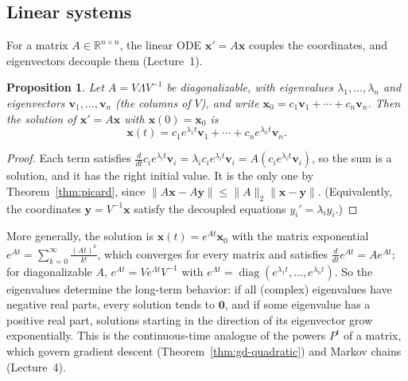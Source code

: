 \documentclass[11pt]{article}
\newcommand{\norm}[1]{\lVert #1 \rVert}
\theoremstyle{definition}
\theoremstyle{plain}
\newtheorem{proposition}[definition]{Proposition}
\theoremstyle{remark}
\DeclareMathOperator{\diag}{diag}
\begin{document}
\subsection{Linear systems}\label{sec:linear-ode}

For a matrix $A \in \mathbb{R}^{n \times n}$, the linear ODE $\mathbf{x}' = A\mathbf{x}$ couples the coordinates, and eigenvectors decouple them (Lecture~1).

\begin{proposition}\label{prop:linear-ode}
    Let $A = V\Lambda V^{-1}$ be diagonalizable, with eigenvalues $\lambda_1, \ldots, \lambda_n$ and eigenvectors $\mathbf{v}_1, \ldots, \mathbf{v}_n$ (the columns of $V$), and write $\mathbf{x}_0 = c_1\mathbf{v}_1 + \cdots + c_n\mathbf{v}_n$. Then the solution of $\mathbf{x}' = A\mathbf{x}$ with $\mathbf{x}(0) = \mathbf{x}_0$ is
    \[\mathbf{x}(t) = c_1e^{\lambda_1 t}\mathbf{v}_1 + \cdots + c_ne^{\lambda_n t}\mathbf{v}_n.\]
\end{proposition}

\begin{proof}
    Each term satisfies $\frac{d}{dt}c_ie^{\lambda_i t}\mathbf{v}_i = \lambda_ic_ie^{\lambda_i t}\mathbf{v}_i = A(c_ie^{\lambda_i t}\mathbf{v}_i)$, so the sum is a solution, and it has the right initial value. It is the only one by Theorem~\ref{thm:picard}, since $\norm{A\mathbf{x} - A\mathbf{y}} \leq \norm{A}_2\norm{\mathbf{x} - \mathbf{y}}$. (Equivalently, the coordinates $\mathbf{y} = V^{-1}\mathbf{x}$ satisfy the decoupled equations $y_i' = \lambda_i y_i$.)
\end{proof}

More generally, the solution is $\mathbf{x}(t) = e^{At}\mathbf{x}_0$ with the matrix exponential $e^{At} = \sum_{k=0}^\infty \frac{(At)^k}{k!}$, which converges for every matrix and satisfies $\frac{d}{dt}e^{At} = Ae^{At}$; for diagonalizable $A$, $e^{At} = Ve^{\Lambda t}V^{-1}$ with $e^{\Lambda t} = \diag(e^{\lambda_1 t}, \ldots, e^{\lambda_n t})$. So the eigenvalues determine the long-term behavior: if all (complex) eigenvalues have negative real parts, every solution tends to $\mathbf{0}$, and if some eigenvalue has a positive real part, solutions starting in the direction of its eigenvector grow exponentially. This is the continuous-time analogue of the powers $P^t$ of a matrix, which govern gradient descent (Theorem~\ref{thm:gd-quadratic}) and Markov chains (Lecture~4).
\end{document}
